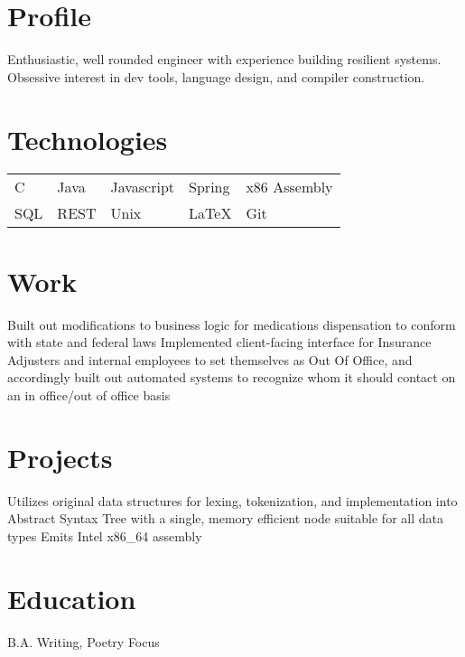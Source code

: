 \documentclass{my_cv}
\begin{document}

 \vspace{1mm}
 \vspace{1mm}

\section{Profile}
{Enthusiastic, well rounded engineer with experience building resilient systems. 
Obsessive interest in dev tools, language design, and compiler construction.}

\section{Technologies}
\begin{tabular}{l l l l l}
    C & Java & Javascript & Spring & x86 Assembly\\
    SQL & REST & Unix & \LaTeX{} & Git
\end{tabular}
 
\section{Work}
{Built out modifications to business logic for medications dispensation to conform with state and federal laws}
{Implemented client-facing interface for Insurance Adjusters and internal employees to set themselves as Out Of Office,
and accordingly built out automated systems to recognize whom it should contact on an in office/out of office basis} 

\section{Projects}
{Utilizes original data structures for lexing, tokenization, and implementation into Abstract Syntax Tree 
with a single, memory efficient node suitable for all data types}
{Emits Intel x86\_64 assembly}

\section{Education}
B.A. Writing, Poetry Focus
\end{document}
